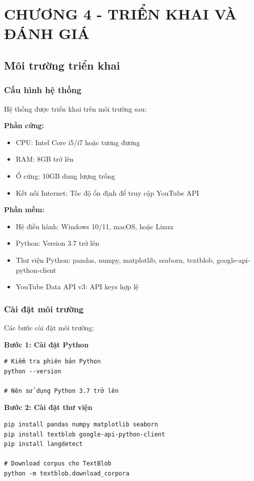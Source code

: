 
\section*{CHƯƠNG 4 - TRIỂN KHAI VÀ ĐÁNH GIÁ}
\setcounter{section}{4}
\setcounter{subsection}{0}
\setcounter{figure}{0}
\setcounter{table}{0}

\subsection{Môi trường triển khai}

\subsubsection{Cấu hình hệ thống}
Hệ thống được triển khai trên môi trường sau:

\textbf{Phần cứng:}
\begin{itemize}
    \item CPU: Intel Core i5/i7 hoặc tương đương
    \item RAM: 8GB trở lên
    \item Ổ cứng: 10GB dung lượng trống
    \item Kết nối Internet: Tốc độ ổn định để truy cập YouTube API
\end{itemize}

\textbf{Phần mềm:}
\begin{itemize}
    \item Hệ điều hành: Windows 10/11, macOS, hoặc Linux
    \item Python: Version 3.7 trở lên
    \item Thư viện Python: pandas, numpy, matplotlib, seaborn, textblob, google-api-python-client
    \item YouTube Data API v3: API keys hợp lệ
\end{itemize}

\subsubsection{Cài đặt môi trường}
Các bước cài đặt môi trường:

\textbf{Bước 1: Cài đặt Python}
\begin{verbatim}
# Kiểm tra phiên bản Python
python --version

# Nên sử dụng Python 3.7 trở lên
\end{verbatim}

\textbf{Bước 2: Cài đặt thư viện}
\begin{verbatim}
pip install pandas numpy matplotlib seaborn
pip install textblob google-api-python-client
pip install langdetect

# Download corpus cho TextBlob
python -m textblob.download_corpora
\end{verbatim}

